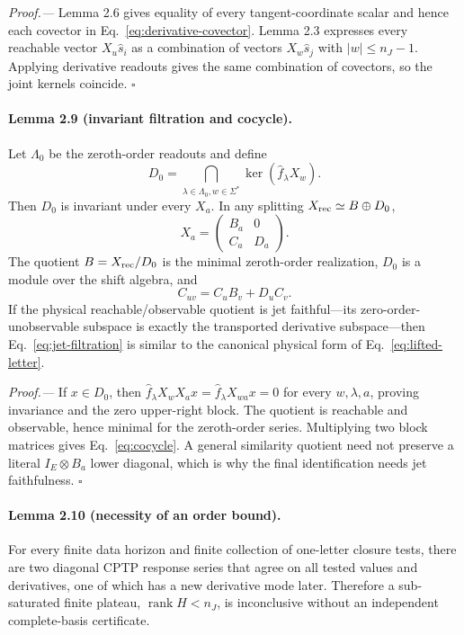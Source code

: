 \documentclass[aps,prl,reprint,superscriptaddress,nofootinbib]{revtex4-2}
\newcommand{\C}{\mathbb C}
\newcommand{\rank}{\operatorname{rank}}
\begin{document}
\emph{Proof.---}
Lemma 2.6 gives equality of every tangent-coordinate scalar and hence each covector in Eq.~\eqref{eq:derivative-covector}.  Lemma 2.3 expresses every reachable vector $X_u\widehat s_i$ as a combination of vectors $X_w\widehat s_j$ with $|w|\le n_J-1$.  Applying derivative readouts gives the same combination of covectors, so the joint kernels coincide. \hfill$\square$

\paragraph{Lemma 2.9 (invariant filtration and cocycle).}
Let $\Lambda_0$ be the zeroth-order readouts and define
\begin{equation}
 D_0=\bigcap_{\lambda\in\Lambda_0,w\in\Sigma^*}
 \ker(\widehat f_\lambda X_w).
 \label{eq:D0}
\end{equation}
Then $D_0$ is invariant under every $X_a$.  In any splitting $X_{\rm rec}\simeq B\oplus D_0$,
\begin{equation}
 X_a=\begin{pmatrix}B_a&0\\C_a&D_a\end{pmatrix}.
 \label{eq:jet-filtration}
\end{equation}
The quotient $B=X_{\rm rec}/D_0$ is the minimal zeroth-order realization, $D_0$ is a module over the shift algebra, and
\begin{equation}
 C_{uv}=C_uB_v+D_uC_v.
 \label{eq:cocycle}
\end{equation}
If the physical reachable/observable quotient is jet faithful---its zero-order-unobservable subspace is exactly the transported derivative subspace---then Eq.~\eqref{eq:jet-filtration} is similar to the canonical physical form of Eq.~\eqref{eq:lifted-letter}.

\emph{Proof.---}
If $x\in D_0$, then $\widehat f_\lambda X_wX_ax=\widehat f_\lambda X_{wa}x=0$ for every $w,\lambda,a$, proving invariance and the zero upper-right block.  The quotient is reachable and observable, hence minimal for the zeroth-order series.  Multiplying two block matrices gives Eq.~\eqref{eq:cocycle}.  A general similarity quotient need not preserve a literal $I_E\otimes B_a$ lower diagonal, which is why the final identification needs jet faithfulness. \hfill$\square$

\paragraph{Lemma 2.10 (necessity of an order bound).}
For every finite data horizon and finite collection of one-letter closure tests, there are two diagonal CPTP response series that agree on all tested values and derivatives, one of which has a new derivative mode later.  Therefore a sub-saturated finite plateau, $\rank H<n_J$, is inconclusive without an independent complete-basis certificate.
\end{document}
